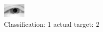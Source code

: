 \begin{figure}[h!]
\begin{center}
\includegraphics[width=0.60\columnwidth]{figures/ID2223_class_1_target_2.png}
\end{center}
\caption{ Classification: 1 actual target: 2}
\label{fig:ID2223_class_1_target_2}
\end{figure}

